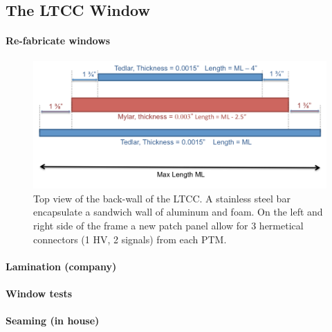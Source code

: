 \subsection{The LTCC Window}


\paragraph{Re-fabricate windows}

\begin{figure}[hbt]
	\centering
	\includegraphics[width=1.0\columnwidth,keepaspectratio]{img/windowDesign.png}
	\caption{Top view of the back-wall of the LTCC. A stainless steel bar encapsulate a sandwich wall of aluminum and foam. On the left and right side
				 of the frame a new patch panel allow for 3 hermetical connectors (1 HV, 2 signals) from each PTM. }
	\label{fig:windowDesign}
\end{figure}



\paragraph{Lamination (company)}


\paragraph{Window tests}



\paragraph{Seaming (in house)}


